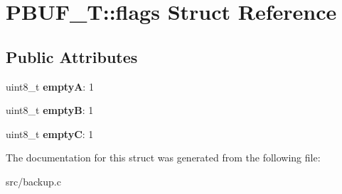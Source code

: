 \hypertarget{structPBUF__T_1_1flags}{}\section{P\+B\+U\+F\+\_\+T\+:\+:flags Struct Reference}
\label{structPBUF__T_1_1flags}
\subsection*{Public Attributes}
\begin{DoxyCompactItemize}
\item 
\mbox{\label{structPBUF__T_1_1flags_a08f56a92ba153913fa810cecc132285b}} 
uint8\+\_\+t {\bfseries emptyA}\+: 1
\item 
\mbox{\label{structPBUF__T_1_1flags_a345e9365bb6efa345dbd705c6b434ca5}} 
uint8\+\_\+t {\bfseries emptyB}\+: 1
\item 
\mbox{\label{structPBUF__T_1_1flags_af57b7a495aef49f3f6a59ff78463cb76}} 
uint8\+\_\+t {\bfseries emptyC}\+: 1
\end{DoxyCompactItemize}


The documentation for this struct was generated from the following file\+:\begin{DoxyCompactItemize}
\item 
src/backup.\+c\end{DoxyCompactItemize}
